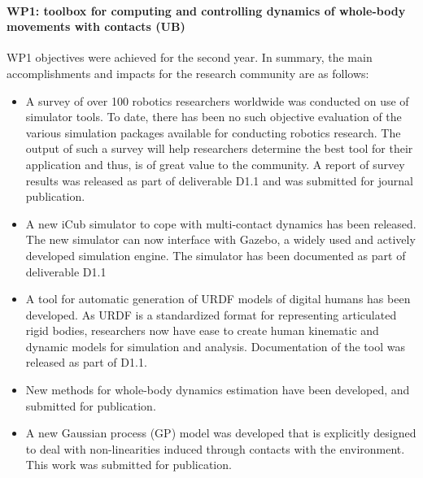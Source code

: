 

\paragraph*{WP1: toolbox for computing and controlling dynamics of whole-body movements with contacts (UB)}

WP1 objectives were achieved for the second year. In summary, the main accomplishments and impacts for the research community are as follows: 

\begin{itemize}

\item A survey of over 100 robotics researchers worldwide was conducted on use of simulator tools.  To date, there has been no such objective evaluation of the various simulation packages available for conducting robotics research. The output of such a survey will help researchers determine the best tool for their application and thus, is of great value to the community.  A report of survey results was released as part of deliverable D1.1 and was submitted for journal publication. 

\item A new iCub simulator to cope with multi-contact dynamics has been released. The new simulator can now interface with Gazebo, a widely used and actively developed simulation engine. The simulator has been documented as part of deliverable D1.1

\item A tool for automatic generation of URDF models of digital humans has been developed. As URDF is a standardized format for representing articulated rigid bodies, researchers  now have ease to create human kinematic and dynamic models for simulation and analysis. Documentation of the tool was released as part of D1.1. 

\item New methods for whole-body dynamics estimation have been developed, and submitted for publication. 

\item A new Gaussian process (GP) model was developed that is explicitly designed to deal with non-linearities induced through contacts with the environment. This work was submitted for publication. 
 
 \end{itemize}

